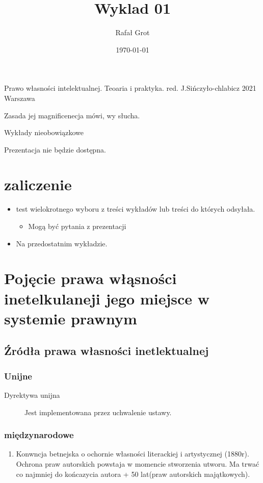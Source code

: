 \documentclass[11pt]{article}
\author{Rafał Grot}
\date{\today}
\title{Wyklad 01}
\begin{document}
\maketitle
\tableofcontents

\begin{description}
\item[{Podręcznik}] Prawo własności intelektualnej. Teoaria i praktyka. red. J.Sińczyło-chlabicz 2021 Warszawa
\item[{Pytania na koniec}] Zasada jej magnificenecja mówi, wy słucha.
\item Wykłady nieobowiązkowe
\item Prezentacja nie będzie dostępna.
\end{description}
\section{zaliczenie}
\label{sec:orgaf5af19}
\begin{itemize}
\item test wielokrotnego wyboru z treści wykładów lub treści do których odsyłała.
\begin{itemize}
\item Mogą być pytania z prezentacji
\end{itemize}
\item Na przedostatnim wykładzie.
\end{itemize}
\section{Pojęcie prawa włąsności inetelkulaneji jego miejsce w systemie prawnym}
\label{sec:org95a2d5d}
\subsection{Źródła prawa własności inetlektualnej}
\label{sec:org17cfef6}
\subsubsection{Unijne}
\label{sec:orge801d8d}
\begin{description}
\item[{Dyrektywa unijna}] Jest implementowana przez uchwalenie ustawy.
\end{description}
\subsubsection{międzynarodowe}
\label{sec:orgc45a23c}
\begin{enumerate}
\item Konwncja betnejska o ochornie własności literackiej i artystycznej (1880r).
\label{sec:orgdec1c85}
Ochrona praw autorskich powstaja w momencie stworzenia utworu. Ma trwać co najmniej do końcazycia autora + 50 lat(praw autorskich majątkowych).
\end{enumerate}
\end{document}
